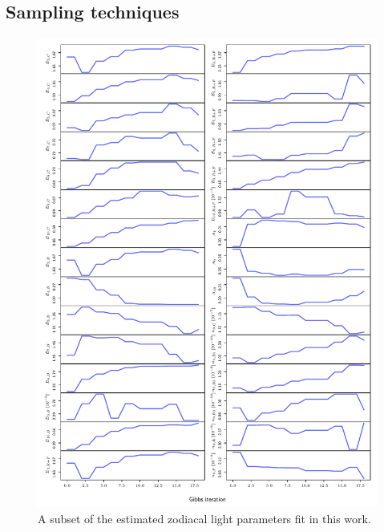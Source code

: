 \documentclass{aa}
\begin{document}
\subsection{Sampling techniques}

\begin{figure}
    \centering
    \includegraphics{figs/zodi_params_new.pdf}
    \caption{A subset of the estimated zodiacal light parameters fit in this work.}
    \label{fig: zodi_trace}

\end{figure}
\end{document}
